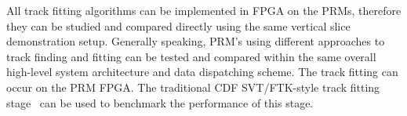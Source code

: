 
\noindent  
\noindent

All track fitting algorithms can be implemented in FPGA on the PRMs, therefore they can be studied and compared directly using the same vertical slice demonstration setup. Generally speaking,
PRM's using different approaches to track finding and fitting can be tested and compared within the same overall high-level system architecture and data dispatching scheme. The track fitting can occur on the PRM FPGA. The traditional CDF SVT/FTK-style track fitting stage~\cite{bib:Ann-09} can be used to benchmark the performance of this stage. 




